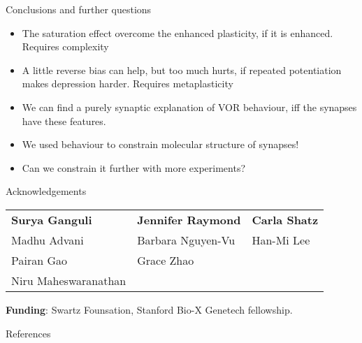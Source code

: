 \documentclass{beamer}%
\begin{document}
\begin{frame}{Conclusions and further questions}
%
 \begin{itemize}
   \item The saturation effect overcome the enhanced plasticity, if it is enhanced.
   \alert{Requires complexity}
   \item A little reverse bias can help, but too much hurts, if repeated potentiation makes depression harder.
   \alert{Requires metaplasticity}
   \item We can find a purely synaptic explanation of VOR behaviour, iff the synapses have these features.
   \item We used behaviour to constrain molecular structure of synapses!
   \item Can we constrain it further with more experiments?
 \end{itemize}
%
\end{frame}


\begin{frame}{Acknowledgements}
%
 \begin{tabular}{lll}
   \textbf{Surya Ganguli} & \textbf{Jennifer Raymond} & \textbf{Carla Shatz} \\
   Madhu Advani & Barbara Nguyen-Vu & Han-Mi Lee \\
   Pairan Gao & Grace Zhao & \\
   Niru Maheswaranathan
 \end{tabular}
 
 \vp\textbf{Funding}: Swartz Founsation, Stanford Bio-X Genetech fellowship.
%
\end{frame}


\begin{frame}[allowframebreaks]{References}
%

 {\small
 
 
 }
%
\end{frame}


\end{document}
